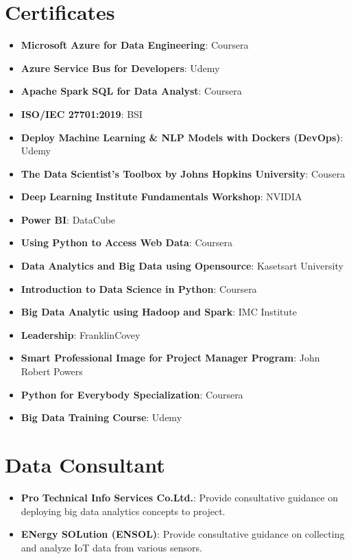 \documentclass[letterpaper,11pt]{article}
\newcommand{\resumeItem}[2]{
  \item\small{
    \textbf{#1}{: #2 \vspace{-2pt}}
  }
}
\newcommand{\resumeSubItem}[2]{\resumeItem{#1}{#2}\vspace{-4pt}}
\newcommand{\resumeSubHeadingListStart}{\begin{itemize}[leftmargin=*]}
\newcommand{\resumeSubHeadingListEnd}{\end{itemize}}
\begin{document}
\begin{refsection}
  \nocite{book2013}
  \nocite{book2013a}
  \nocite{book2012}
  \nocite{book2012a}
  \nocite{book2012b}
  \nocite{book2007}
  \nocite{kerdsri2003snmp}
	\AtNextBibliography{\small}
	\printbibliography[title={Books}]
\end{refsection}

\section{Certificates}
  \resumeSubHeadingListStart
  \resumeSubItem{Microsoft Azure for Data Engineering}{Coursera}
  \resumeSubItem{Azure Service Bus for Developers}{Udemy}
  \resumeSubItem{Apache Spark SQL for Data Analyst}{Coursera}
  \resumeSubItem{ISO/IEC 27701:2019}{BSI}
  \resumeSubItem{Deploy Machine Learning \& NLP Models with Dockers (DevOps)}{Udemy}
  \resumeSubItem{The Data Scientist’s Toolbox by Johns Hopkins University}{Cousera}
  \resumeSubItem{Deep Learning Institute Fundamentals Workshop}{NVIDIA}
  \resumeSubItem{Power BI}{DataCube}
  \resumeSubItem{Using Python to Access Web Data}{Coursera}  
  \resumeSubItem{Data Analytics and Big Data using Opensource}{Kasetsart University}
  \resumeSubItem{Introduction to Data Science in Python}{Coursera}   
  \resumeSubItem{Big Data Analytic using Hadoop and Spark}{IMC Institute}
  \resumeSubItem{Leadership}{FranklinCovey}
  \resumeSubItem{Smart Professional Image for Project Manager Program}{John Robert Powers}
  \resumeSubItem{Python for Everybody Specialization}{Coursera}
  \resumeSubItem{Big Data Training Course}{Udemy}         
  \resumeSubHeadingListEnd


  \section{Data Consultant}
  \resumeSubHeadingListStart
  \resumeSubItem{Pro Technical Info Services Co.Ltd.}{Provide consultative guidance on deploying big data analytics concepts to project.}
  \resumeSubItem{ENergy SOLution (ENSOL)}{Provide consultative guidance on collecting and analyze IoT data from various sensors.}     
  \resumeSubHeadingListEnd

\end{document}
